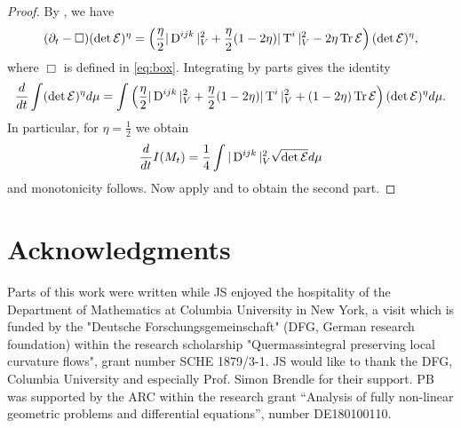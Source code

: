 \documentclass[a4paper,12pt]{amsart}
\begin{document}
\begin{proof}
By \cite[Proposition 9]{MR2055396}, we have
\[
(\partial_t - \Box) (\det\operatorname{\mathcal{E}})^\eta = \left(\frac{\eta}{2}|\operatorname{D}^{ijk}|_V^2 + \frac{\eta}{2}(1-2\eta)|\operatorname{T}^i|^2_V - 2\eta\operatorname{Tr}\operatorname{\mathcal{E}}\right)(\det\operatorname{\mathcal{E}})^\eta,
\]
where \(\Box\) is defined in \eqref{eq:box}. Integrating by parts gives the identity
\[
\frac{d}{dt}\int(\det\operatorname{\mathcal{E}})^\eta d\mu = \int \left(\frac{\eta}{2}|\operatorname{D}^{ijk}|_V^2 + \frac{\eta}{2}(1-2\eta)|\operatorname{T}^i|^2_V + (1-2\eta)\operatorname{Tr}\operatorname{\mathcal{E}}\right)(\det\operatorname{\mathcal{E}})^\eta d\mu.
\]
In particular, for $\eta=\frac{1}{2}$ we obtain
\[
\frac{d}{dt}I(M_t) = \frac{1}{4}\int |\operatorname{D}^{ijk}|_V^2\sqrt{\det\operatorname{\mathcal{E}}}d\mu
\]
and monotonicity follows. Now apply  and  to obtain the second part.
\end{proof}

\section*{Acknowledgments}

Parts of this work were written while JS enjoyed the hospitality of the Department of Mathematics at Columbia University in New York, a visit which is funded by the "Deutsche Forschungsgemeinschaft" (DFG, German research foundation) within the research scholarship "Quermassintegral preserving local curvature flows", grant number SCHE 1879/3-1. JS would like to thank the DFG, Columbia University and especially Prof. Simon Brendle for their support. PB was supported by the ARC within the research grant “Analysis of fully non-linear geometric problems and differential equations”, number DE180100110.


\printbibliography
\end{document}
